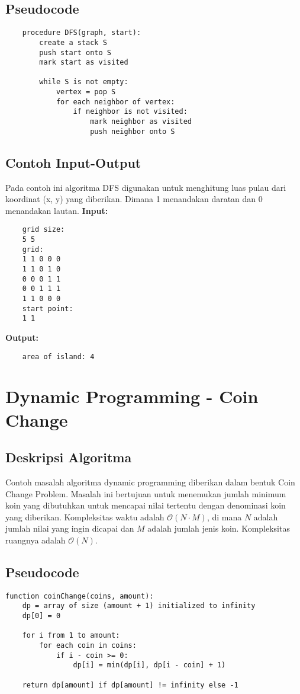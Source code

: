 \subsection{Pseudocode}
\begin{verbatim}
    procedure DFS(graph, start):
        create a stack S
        push start onto S
        mark start as visited

        while S is not empty:
            vertex = pop S
            for each neighbor of vertex:
                if neighbor is not visited:
                    mark neighbor as visited
                    push neighbor onto S
\end{verbatim}

\subsection{Contoh Input-Output}
Pada contoh ini algoritma DFS digunakan untuk menghitung luas pulau dari koordinat (x, y) yang diberikan. Dimana 1 menandakan daratan dan 0 menandakan lautan.
\textbf{Input:}
\begin{verbatim}
    grid size:
    5 5
    grid:
    1 1 0 0 0
    1 1 0 1 0
    0 0 0 1 1
    0 0 1 1 1
    1 1 0 0 0
    start point:
    1 1
\end{verbatim}

\textbf{Output:}
\begin{verbatim}
    area of island: 4
\end{verbatim}

\section{Dynamic Programming - Coin Change}
\label{sec:coin-change-implementation}

\subsection{Deskripsi Algoritma}
Contoh masalah algoritma dynamic programming diberikan dalam bentuk Coin Change Problem. Masalah ini bertujuan untuk menemukan jumlah minimum koin yang dibutuhkan untuk mencapai nilai tertentu dengan denominasi koin yang diberikan. Kompleksitas waktu adalah $\mathcal{O}\left(N \cdot M\right)$, di mana $N$ adalah jumlah nilai yang ingin dicapai dan $M$ adalah jumlah jenis koin. Kompleksitas ruangnya adalah $\mathcal{O}\left(N\right)$.


\subsection{Pseudocode}
\begin{verbatim}
function coinChange(coins, amount):
    dp = array of size (amount + 1) initialized to infinity
    dp[0] = 0

    for i from 1 to amount:
        for each coin in coins:
            if i - coin >= 0:
                dp[i] = min(dp[i], dp[i - coin] + 1)

    return dp[amount] if dp[amount] != infinity else -1
\end{verbatim}

